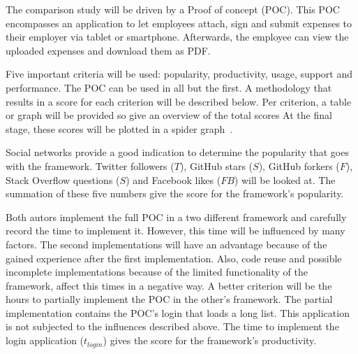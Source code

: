 \documentclass[a4paper]{artikel3}
\newcommand{\setspace}[0]{\vspace{2mm}}
\renewcommand{\paragraph}[1]{\setspace \noindent {\bf #1}  }
\begin{document}
The comparison study will be driven by a Proof of concept (POC).  
This POC encompasses an application to let employees attach, sign and submit expenses to their employer via tablet or smartphone.
Afterwards, the employee can view the uploaded expenses and download them as PDF.

Five important criteria will be used:  popularity,  productivity,  usage,  support and performance. 
The POC can be used in all but the first.   
A methodology that results in a score for each criterion will be described below.  
Per criterion,  a table or graph will be provided so give an overview of the total scores
At the final stage,  these scores will be plotted in a spider graph~\cite{Few2005}.   

\paragraph{Popularity}

Social networks provide a good indication to determine the popularity that goes with the framework.  
Twitter followers ($T$),  GitHub stars ($S$),  GitHub forkers ($F$),  Stack Overflow questions ($S$) and Facebook likes ($FB$) will be looked at.
The summation of these five numbers give the score for the framework's popularity.  


\paragraph{Productivity}
Both autors implement the full POC in a two different framework and carefully record the time to implement it.  
However,  this time will be influenced by many factors.
The second implementations will have an advantage because of the gained experience after the first implementation.
Also,  code reuse and possible incomplete implementations because of the limited functionality of the framework, affect this times in a negative way.
A better criterion will be the hours to partially implement the POC in the other's framework.  
The partial implementation contains the POC's login that loads a long list.%
This application is not subjected to the influences described above. %
The time to implement the login application ($t_{login}$) gives the score for the framework's productivity. 
\end{document}
